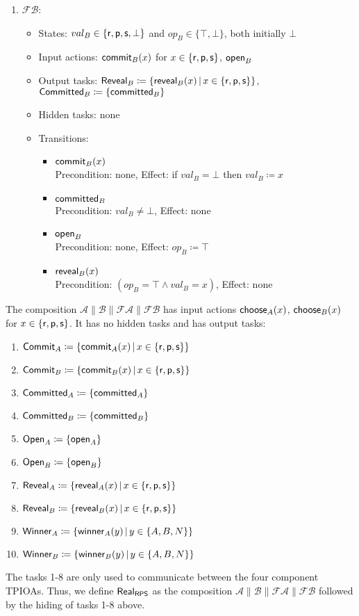 \documentclass[10pt]{article}
\begin{document}
\begin{example}[$\RPSReal$]
\begin{enumerate}
\item $\mathcal{FB}$:
\begin{itemize}
\item States: $val_B \in \{\mathsf{r},\mathsf{p},\mathsf{s},\bot\}$ and $op_B \in \{\top,\bot\}$, both initially $\bot$
\item Input actions: $\mathsf{commit}_B(x)$ for $x \in \{\mathsf{r},\mathsf{p},\mathsf{s}\}$, $\mathsf{open}_B$
\item Output tasks: $\mathsf{Reveal}_B \coloneqq \{\mathsf{reveal}_B(x) \, | \, x \in \{\mathsf{r},\mathsf{p},\mathsf{s}\}\}$, $\mathsf{Committed}_B \coloneqq \{\mathsf{committed}_B\}$
\item Hidden tasks: none
\item Transitions:
\begin{itemize}
\item $\mathsf{commit}_B(x)$ \\
Precondition: none, Effect: if $val_B = \bot$ then $val_B \coloneqq x$
\item $\mathsf{committed}_B$ \\
Precondition: $val_B \neq \bot$, Effect: none
\item $\mathsf{open}_B$\\
Precondition: none, Effect: $op_B \coloneqq \top$
\item $\mathsf{reveal}_B(x)$\\
Precondition: $(op_B = \top \wedge val_B = x)$, Effect: none
\end{itemize}
\end{itemize}
\end{enumerate}
The composition $\mathcal{A} \parallel \mathcal{B} \parallel \mathcal{FA} \parallel \mathcal{FB}$ has input actions $\mathsf{choose}_A(x)$, $\mathsf{choose}_B(x)$ for $x \in \{\mathsf{r},\mathsf{p},\mathsf{s}\}$. It has no hidden tasks and has output tasks: 
\begin{enumerate}
\item $\mathsf{Commit}_A \coloneqq \{\mathsf{commit}_A(x) \, | \, x \in \{\mathsf{r},\mathsf{p},\mathsf{s}\}\}$
\item $\mathsf{Commit}_B \coloneqq \{\mathsf{commit}_B(x) \, | \, x \in \{\mathsf{r},\mathsf{p},\mathsf{s}\}\}$
\item $\mathsf{Committed}_A \coloneqq \{\mathsf{committed}_A\}$
\item $\mathsf{Committed}_B \coloneqq \{\mathsf{committed}_B\}$
\item $\mathsf{Open}_A \coloneqq \{\mathsf{open}_A\}$
\item $\mathsf{Open}_B \coloneqq \{\mathsf{open}_B\}$
\item $\mathsf{Reveal}_A \coloneqq \{\mathsf{reveal}_A(x) \, | \, x \in \{\mathsf{r},\mathsf{p},\mathsf{s}\}\}$
\item $\mathsf{Reveal}_B \coloneqq \{\mathsf{reveal}_B(x) \, | \, x \in \{\mathsf{r},\mathsf{p},\mathsf{s}\}\}$
\item $\mathsf{Winner}_A \coloneqq \{\mathsf{winner}_A(y) \, | \, y \in \{A,B,N\}\}$
\item $\mathsf{Winner}_B \coloneqq \{\mathsf{winner}_B(y) \, | \, y \in \{A,B,N\}\}$
\end{enumerate}
The tasks 1-8 are only used to communicate between the four component TPIOAs. Thus, we define $\RPSReal$ as the composition $\mathcal{A} \parallel \mathcal{B} \parallel \mathcal{FA} \parallel \mathcal{FB}$ followed by the hiding of tasks 1-8 above.
\end{example}


%
\end{document}
